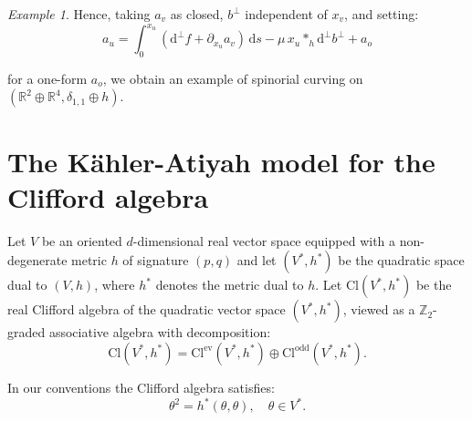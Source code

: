\documentclass[10pt,a4paper,twoside,reqno]{amsart}
\theoremstyle{plain}
\theoremstyle{definition}
\theoremstyle{remark}
\newtheorem{example}[thm]{Example}
\def\Z{\mathbb{Z}}
\def\dd{\mathrm{d}}
\def\dd{\mathrm{d}}
\begin{document}
\begin{example}
\noindent
Hence, taking $a_v$ as closed, $b^{\perp}$ independent of $x_v$, and setting:
\begin{equation*}
a_u = \int_{0}^{x_u}  (\dd^{\perp}f + \partial_{x_u} a_v )\, \dd s  - \mu \, x_u \ast_h \dd^{\perp} b^{\perp} + a_o
\end{equation*}

\noindent
for a one-form $a_o$, we obtain an example of spinorial curving on $(\mathbb{R}^2 \oplus \mathbb{R}^4 , \delta_{1,1}\oplus h)$.
\end{example}


\appendix



\section{The Kähler-Atiyah model for the Clifford algebra}
\label{app:KA}


Let $V$ be an oriented $d$-dimensional real vector space equipped with a non-degenerate metric $h$ of signature $(p,q)$ and let $(V^*,h^*)$ be the quadratic space dual to $(V,h)$, where $h^*$ denotes the metric dual to $h$. Let $\mathrm{Cl}(V^*,h^*)$ be the real Clifford algebra of the quadratic vector space $(V^*,h^*)$, viewed as a $\Z_2$-graded associative algebra with decomposition: $$\mathrm{Cl}(V^*,h^*)=\mathrm{Cl}^{\mathrm{ev}}(V^*,h^*)\oplus\mathrm{Cl}^{\mathrm{odd}}(V^*,h^*).$$

In our conventions the Clifford algebra satisfies: $$\theta^2=h^*(\theta,\theta),\quad\theta\in V^*.$$
\end{document}
